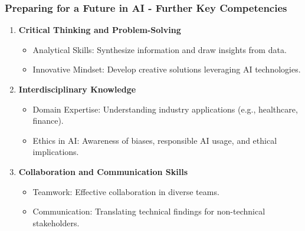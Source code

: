 \documentclass{beamer}
\begin{document}
\begin{frame}[fragile]
    \frametitle{Preparing for a Future in AI - Further Key Competencies}
    \begin{enumerate}[resume]
        \item \textbf{Critical Thinking and Problem-Solving}
        \begin{itemize}
            \item Analytical Skills: Synthesize information and draw insights from data.
            \item Innovative Mindset: Develop creative solutions leveraging AI technologies.
        \end{itemize}

        \item \textbf{Interdisciplinary Knowledge}
        \begin{itemize}
            \item Domain Expertise: Understanding industry applications (e.g., healthcare, finance).
            \item Ethics in AI: Awareness of biases, responsible AI usage, and ethical implications.
        \end{itemize}

        \item \textbf{Collaboration and Communication Skills}
        \begin{itemize}
            \item Teamwork: Effective collaboration in diverse teams.
            \item Communication: Translating technical findings for non-technical stakeholders.
        \end{itemize}
    \end{enumerate}
\end{frame}
\end{document}
